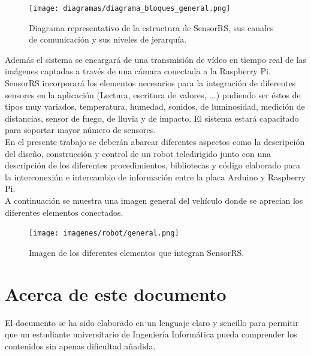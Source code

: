 \begin{figure}[h]
  \begin{center}
    \texttt{[image: diagramas/diagrama\_bloques\_general.png]}
  \end{center}
  \caption{ Diagrama representativo de la estructura de SensorRS, sus canales de comunicación y sus niveles de jerarquía.}
  \label{diagrama:representacion_sistema}
\end{figure}


Además el sistema se encargará de una transmisión de vídeo en tiempo real de las imágenes captadas a través de una cámara conectada a la Raspberry Pi.\\

SensorRS incorporará los elementos necesarios para la integración de diferentes sensores en la aplicación (Lectura, escritura de valores, ...) pudiendo ser éstos de tipos muy
variados, temperatura, humedad, sonidos, de luminosidad, medición de distancias, sensor de fuego, de lluvia y de impacto. El sistema estará capacitado para soportar mayor número
de sensores. \\

En el presente trabajo se deberán abarcar diferentes aspectos como la descripción del diseño, construcción y control de un robot teledirigido junto con una descripción de los 
diferentes procedimientos, bibliotecas y código elaborado para la interconexión e intercambio de información entre la placa Arduino y Raspberry Pi.\\

A continuación se muestra una imagen general del vehículo donde se aprecian los diferentes elementos conectados.\\

\begin{figure}[H]
  \begin{center}
    \texttt{[image: imagenes/robot/general.png]}
  \end{center}
  \caption{ Imagen de los diferentes elementos que integran SensorRS.}
  \label{diagrama:representacion_sistema}
\end{figure}


\section{Acerca de este documento}

El documento se ha sido elaborado en un lenguaje claro y sencillo para permitir que un estudiante universitario de Ingeniería Informática pueda comprender los contenidos sin apenas dificultad añadida.\\

